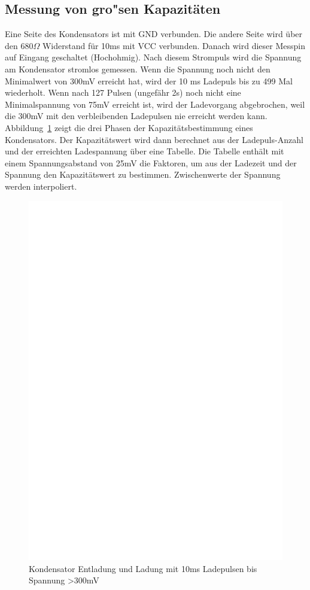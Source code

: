 \subsection{Messung von gro"sen Kapazit\"aten}
\label{sec:bigcap}
Eine Seite des Kondensators ist mit GND verbunden. Die andere Seite wird \"uber den \(680\Omega\) Widerstand f\"ur 10ms mit VCC verbunden.
Danach wird dieser Messpin auf Eingang geschaltet (Hochohmig).
Nach diesem Strompuls wird die Spannung am Kondensator stromlos gemessen.
Wenn die Spannung noch nicht den Minimalwert von 300mV erreicht hat, wird der 10 ms Ladepuls bis zu 499 Mal wiederholt.
Wenn nach 127 Pulsen (ungef\"ahr 2s) noch nicht eine Minimalspannung von 75mV erreicht ist, wird der Ladevorgang abgebrochen,
 weil die 300mV mit den verbleibenden Ladepulsen nie erreicht werden kann.
Abbildung~\ref{fig:bigcap1} zeigt die drei Phasen der Kapazit\"atsbestimmung eines Kondensators.
Der Kapazit\"atswert wird dann berechnet aus der Ladepuls-Anzahl und der erreichten Ladespannung \"uber eine Tabelle.
Die Tabelle enth\"alt mit einem Spannungsabstand von 25mV die Faktoren, um aus der Ladezeit und der Spannung 
den Kapazit\"atswert zu bestimmen. 
Zwischenwerte der Spannung werden interpoliert.

\begin{figure}[H]
\centering
\includegraphics[]{../FIG/Bigcap.eps}
\caption{Kondensator Entladung und Ladung mit 10ms Ladepulsen bis Spannung \textgreater 300mV}
\label{fig:bigcap1}
\end{figure}

